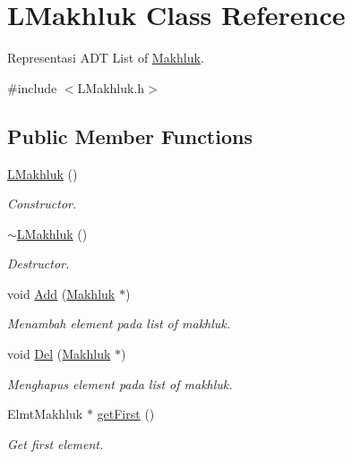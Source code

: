 \hypertarget{class_l_makhluk}{}\section{L\+Makhluk Class Reference}
\label{class_l_makhluk}


Representasi A\+DT List of \hyperlink{class_makhluk}{Makhluk}.  




{\ttfamily \#include $<$L\+Makhluk.\+h$>$}

\subsection*{Public Member Functions}
\begin{DoxyCompactItemize}
\item 
\hyperlink{class_l_makhluk_a93e97387f0cdfa01c31d42832011180c}{L\+Makhluk} ()
\begin{DoxyCompactList}\small\item\em Constructor. \end{DoxyCompactList}\item 
\hyperlink{class_l_makhluk_ab02db38f176572e290cfb444862f96f2}{$\sim$\+L\+Makhluk} ()
\begin{DoxyCompactList}\small\item\em Destructor. \end{DoxyCompactList}\item 
void \hyperlink{class_l_makhluk_ab2d61c43b62e8574b36f486c8907b620}{Add} (\hyperlink{class_makhluk}{Makhluk} $\ast$)
\begin{DoxyCompactList}\small\item\em Menambah element pada list of makhluk. \end{DoxyCompactList}\item 
void \hyperlink{class_l_makhluk_a04f838bb55f2af5c0c3a0068ce21b4ff}{Del} (\hyperlink{class_makhluk}{Makhluk} $\ast$)
\begin{DoxyCompactList}\small\item\em Menghapus element pada list of makhluk. \end{DoxyCompactList}\item 
Elmt\+Makhluk $\ast$ \hyperlink{class_l_makhluk_a0ea8a32be37178cd38e3e2e0ac22d5ee}{get\+First} ()
\begin{DoxyCompactList}\small\item\em Get first element. \end{DoxyCompactList}\item 

\end{DoxyCompactItemize}
